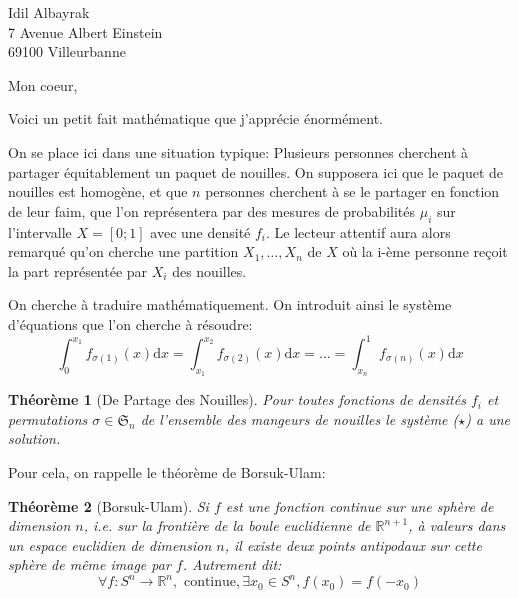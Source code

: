 \documentclass[french]{mpbmail}
\newtheorem{theorem}{Théorème}
\begin{document}
    \begin{letter}{%
        Idil Albayrak\\
        7 Avenue Albert Einstein\\
        69100 Villeurbanne
        }
        \opening{Mon coeur,}
        Voici un petit fait mathématique que j'apprécie énormément.

        On se place ici dans une situation typique: Plusieurs personnes cherchent à partager équitablement un paquet de nouilles. 
        On supposera ici que le paquet de nouilles est homogène, et que $n$ personnes cherchent à se le partager en fonction de leur faim, que l'on représentera par des mesures de probabilités $\mu_{i}$ sur l'intervalle $X = \left[0 ; 1\right]$ avec une densité $f_{i}$. 
        Le lecteur attentif aura alors remarqué qu'on cherche une partition $X_{1}, \ldots, X_{n}$ de $X$ où la i-ème personne reçoit la part représentée par $X_{i}$ des nouilles.

        On cherche à traduire mathématiquement. On introduit ainsi le système d'équations que l'on cherche à résoudre: 
        \begin{equation*}\tag{$\star$}
            \int_{0}^{x_{1}}f_{\sigma(1)}(x) \mathrm{d}x = \int_{x_{1}}^{x_{2}}f_{\sigma(2)}(x)\mathrm{d}x = \ldots = \int_{x_{n}}^{1}f_{\sigma(n)}(x) \mathrm{d}x 
        \end{equation*}                        

        \begin{theorem}[De Partage des Nouilles]\label{thm:nouille-split}
            Pour toutes fonctions de densités $f_{i}$ et permutations $\sigma \in \mathfrak{S}_{n}$ de l'ensemble des mangeurs de nouilles le système ($\star$) a une solution. 
        \end{theorem}
        
        Pour cela, on rappelle le théorème de Borsuk-Ulam: 
        \begin{theorem}[Borsuk-Ulam]\label{thm:borsuk-ulam}
            Si $f$ est une fonction continue sur une sphère de dimension $n$, i.e. sur la frontière de la boule euclidienne de $\mathbb{R}^{n+1}$, à valeurs dans un espace euclidien de dimension $n$, il existe deux points antipodaux sur cette sphère de même image par $f$.
            Autrement dit: 
            \[\forall f: S^{n} \rightarrow \mathbb{R}^{n},\text{ continue}, \exists x_{0} \in S^{n}, f(x_{0}) = f(-x_{0})   \]
        \end{theorem}


\end{letter}
\end{document}
